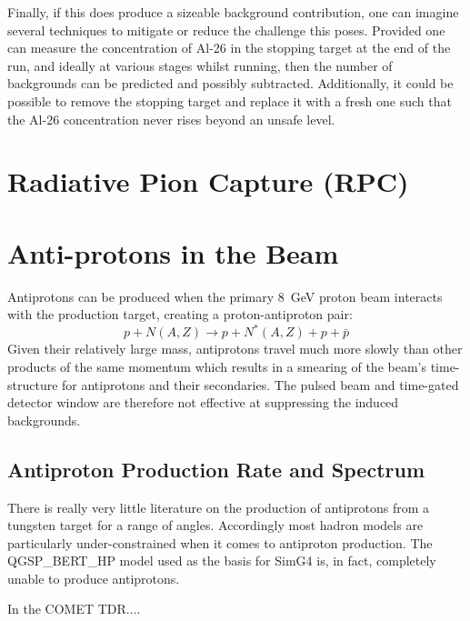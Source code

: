 Finally, if this does produce a sizeable background contribution, one can imagine several techniques to mitigate or reduce the challenge this poses.
Provided one can measure the concentration of Al-26 in the stopping target at the end of the run, and ideally at various stages whilst running, then the number of backgrounds can be predicted and possibly subtracted.
Additionally, it could be possible to remove the stopping target and replace it with a fresh one such that the Al-26 concentration never rises beyond an unsafe level.

\section{Radiative Pion Capture (\acs{RPC})}

\section{Anti-protons in the Beam}
Antiprotons can be produced when the primary 8~GeV proton beam interacts with the production target, creating a proton-antiproton pair:
\begin{equation}
p + N(A,Z) \rightarrow p + N^*(A,Z) + p+\bar{p}
\end{equation}
Given their relatively large mass, antiprotons travel much more slowly than other products of the same momentum which results in a smearing of the beam's time-structure for antiprotons and their secondaries.
The pulsed beam and time-gated detector window are therefore not effective at suppressing the induced backgrounds.

\subsection{Antiproton Production Rate and Spectrum}
There is really very little literature on the production of antiprotons from a tungsten target for a range of angles.
Accordingly most hadron models are particularly under-constrained when it comes to antiproton production.
The QGSP_BERT_HP model used as the basis for SimG4 is, in fact, completely unable to produce antiprotons.

In the COMET TDR....

